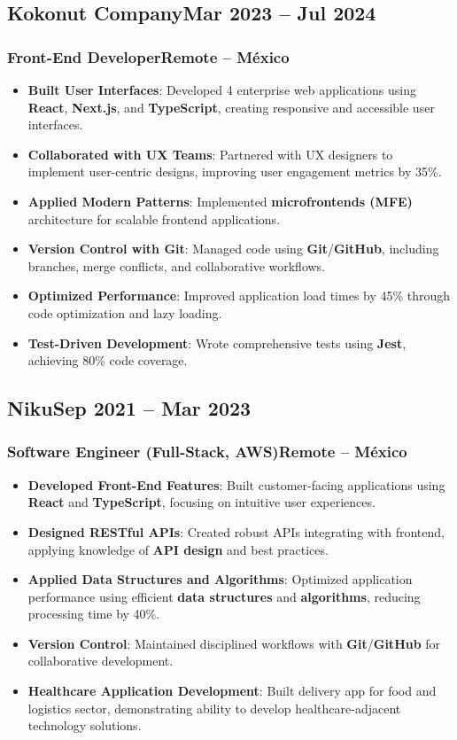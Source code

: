 \documentclass[a4paper,10pt]{article}
\newcommand{\kw}[1]{\textbf{\textcolor{keyword}{#1}}}
\newcommand{\tech}[1]{\textbf{\textcolor{tech}{#1}}}
\begin{document}
\subsection*{Kokonut Company\hfill\textbf{Mar 2023 -- Jul 2024}}
\subsubsection*{Front-End Developer\hfill Remote -- México}
\begin{itemize}[noitemsep, leftmargin=*]
    \item \textbf{Built User Interfaces}: Developed 4 enterprise web applications using \tech{React}, \tech{Next.js}, and \tech{TypeScript}, creating responsive and accessible user interfaces.
    \item \textbf{Collaborated with UX Teams}: Partnered with UX designers to implement user-centric designs, improving user engagement metrics by 35\%.
    \item \textbf{Applied Modern Patterns}: Implemented \kw{microfrontends (MFE)} architecture for scalable frontend applications.
    \item \textbf{Version Control with Git}: Managed code using \tech{Git}/\tech{GitHub}, including branches, merge conflicts, and collaborative workflows.
    \item \textbf{Optimized Performance}: Improved application load times by 45\% through code optimization and lazy loading.
    \item \textbf{Test-Driven Development}: Wrote comprehensive tests using \tech{Jest}, achieving 80\% code coverage.
\end{itemize}

\subsection*{Niku\hfill\textbf{Sep 2021 -- Mar 2023}}
\subsubsection*{Software Engineer (Full-Stack, AWS)\hfill Remote -- México}
\begin{itemize}[noitemsep, leftmargin=*]
    \item \textbf{Developed Front-End Features}: Built customer-facing applications using \tech{React} and \tech{TypeScript}, focusing on intuitive user experiences.
    \item \textbf{Designed RESTful APIs}: Created robust APIs integrating with frontend, applying knowledge of \kw{API design} and best practices.
    \item \textbf{Applied Data Structures and Algorithms}: Optimized application performance using efficient \kw{data structures} and \kw{algorithms}, reducing processing time by 40\%.
    \item \textbf{Version Control}: Maintained disciplined workflows with \tech{Git}/\tech{GitHub} for collaborative development.
    \item \textbf{Healthcare Application Development}: Built delivery app for food and logistics sector, demonstrating ability to develop healthcare-adjacent technology solutions.
\end{itemize}
\end{document}
